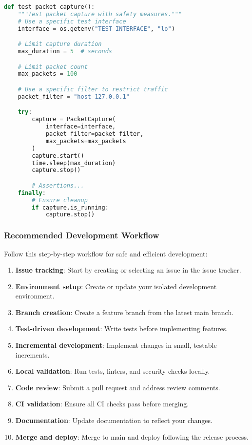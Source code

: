 \begin{lstlisting}[language=python, caption=Safe Testing Example]
def test_packet_capture():
    """Test packet capture with safety measures."""
    # Use a specific test interface
    interface = os.getenv("TEST_INTERFACE", "lo")

    # Limit capture duration
    max_duration = 5  # seconds

    # Limit packet count
    max_packets = 100

    # Use a specific filter to restrict traffic
    packet_filter = "host 127.0.0.1"

    try:
        capture = PacketCapture(
            interface=interface,
            packet_filter=packet_filter,
            max_packets=max_packets
        )
        capture.start()
        time.sleep(max_duration)
        capture.stop()

        # Assertions...
    finally:
        # Ensure cleanup
        if capture.is_running:
            capture.stop()
\end{lstlisting}

\subsubsection{Recommended Development Workflow}
Follow this step-by-step workflow for safe and efficient development:

\begin{enumerate}
    \item \textbf{Issue tracking}: Start by creating or selecting an issue in the issue tracker.
    \item \textbf{Environment setup}: Create or update your isolated development environment.
    \item \textbf{Branch creation}: Create a feature branch from the latest main branch.
    \item \textbf{Test-driven development}: Write tests before implementing features.
    \item \textbf{Incremental development}: Implement changes in small, testable increments.
    \item \textbf{Local validation}: Run tests, linters, and security checks locally.
    \item \textbf{Code review}: Submit a pull request and address review comments.
    \item \textbf{CI validation}: Ensure all CI checks pass before merging.
    \item \textbf{Documentation}: Update documentation to reflect your changes.
    \item \textbf{Merge and deploy}: Merge to main and deploy following the release process.
\end{enumerate}

